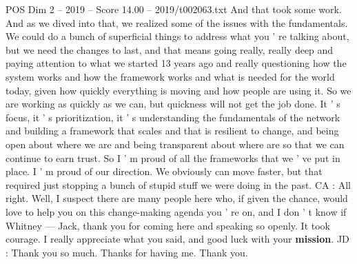 \begin{textsample}{POS Dim 2 – 2019 – Score 14.00 – 2019/t002063.txt}
And that took some work.
And as we dived into that, we realized some of the issues with the fundamentals.
We could do a bunch of superficial things to address what you ' re talking about, but we need the changes to last, and that means going really, really deep and paying attention to what we started 13 years ago and really questioning how the system works and how the framework works and what is needed for the world today, given how quickly everything is moving and how people are using it.
So we are working as quickly as we can, but quickness will not get the job done.
It ' s focus, it ' s prioritization, it ' s understanding the fundamentals of the network and building a framework that scales and that is resilient to change, and being open about where we are and being transparent about where are so that we can continue to earn trust.
So I ' m proud of all the frameworks that we ' ve put in place.
I ' m proud of our direction.
We obviously can move faster, but that required just stopping a bunch of stupid stuff we were doing in the past.
CA : All right.
Well, I suspect there are many people here who, if given the chance, would love to help you on this change-making agenda you ' re on, and I don ' t know if Whitney — Jack, thank you for coming here and speaking so openly.
It took courage.
I really appreciate what you said, and good luck with your \textbf{mission}.
JD : Thank you so much.
Thanks for having me.
Thank you.

\end{textsample}

